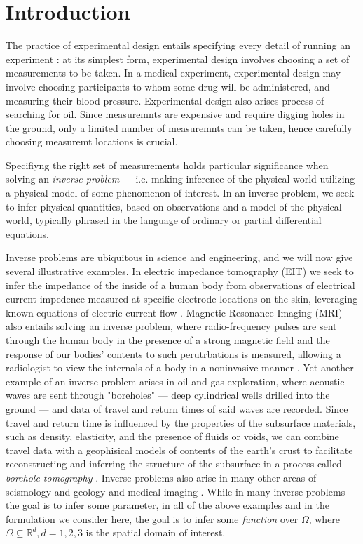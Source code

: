 \section{Introduction}\label{section:intro}
The practice of experimental design entails specifying every detail of
running an experiment \cite{chaloner}: at its simplest form,
experimental design involves choosing a set of measurements to be
taken. In a medical experiment, experimental design may involve
choosing participants to whom some drug will be administered, and
measuring their blood pressure. Experimental design also arises 
process of searching for oil. Since measuremnts are expensive and
require digging holes in the ground, only a limited number of
measuremnts can be taken, hence carefully choosing measuremt locations
is crucial.

Specifiyng the right set of measurements holds particular significance
when solving an \emph{inverse problem} --- i.e. making inference of
the physical world utilizing a physical model of some phenomenon of
interest. In an inverse problem, we seek to infer physical quantities,
based on observations and a model of the physical world, typically
phrased in the language of ordinary or partial differential equations.


Inverse problems are ubiquitous in science and engineering, and we
will now give several illustrative examples. In electric impedance
tomography (EIT) we seek to infer the impedance of the inside of a
human body from observations of electrical current impedence measured
at specific electrode locations on the skin, leveraging known
equations of electric current flow
\cite{horesh2010impedance}. Magnetic Resonance Imaging (MRI) also
entails solving an inverse problem, where radio-frequency pulses are
sent through the human body in the presence of a strong magnetic field
and the response of our bodies' contents to such perutrbations is
measured, allowing a radiologist to view the internals of a body in a
noninvasive manner \cite{horesh2008mri}. Yet another example of an
inverse problem arises in oil and gas exploration, where acoustic
waves are sent through "boreholes" --- deep cylindrical wells drilled
into the ground --- and data of travel and return times of said waves
are recorded. Since travel and return time is influenced by the
properties of the subsurface materials, such as density, elasticity,
and the presence of fluids or voids, we can combine travel data with a
geophisical models of contents of the earth's crust to facilitate
reconstructing and inferring the structure of the subsurface in a
process called \emph{borehole tomography}
\cite{horesh2008borehole}. Inverse problems also arise in many other
areas of seismology and geology \cite{rabinowitz1990, steinberg1995}
and medical imaging \cite{tarantola}. While in many inverse problems
the goal is to infer some parameter, in all of the above examples and
in the formulation we consider here, the goal is to infer some
\emph{function} over $ \Omega$, where \(\Omega \subseteq \mathbb{R}^d,
d=1,2,3\) is the spatial domain of interest.

